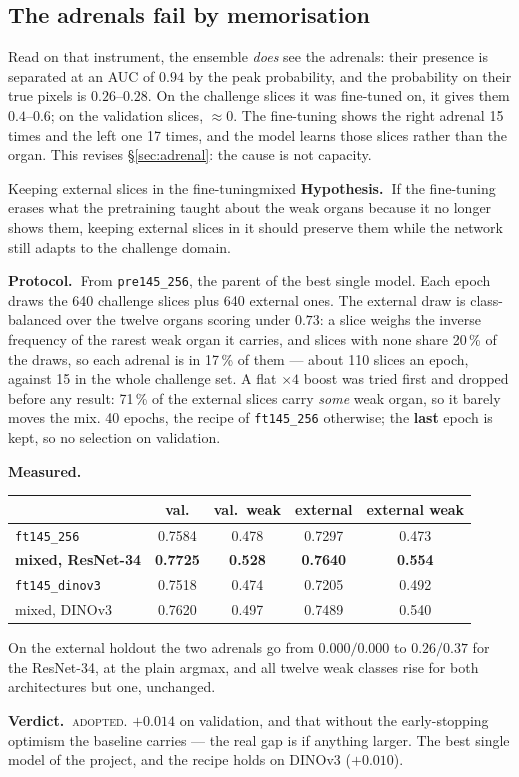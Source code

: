 \documentclass{article}
\newcommand{\hyp}{\textbf{Hypothesis.\ }}
\newcommand{\proto}{\textbf{Protocol.\ }}
\newcommand{\meas}{\textbf{Measured.\ }}
\newcommand{\verd}{\textbf{Verdict.\ }}
\newcommand{\adopted}{\textcolor{mygreen}{\textsc{adopted}}}
\begin{document}
\subsection{The adrenals fail by memorisation}

Read on that instrument, the ensemble \emph{does} see the adrenals: their
presence is separated at an AUC of $0.94$ by the peak probability, and the
probability on their true pixels is $0.26$--$0.28$. On the challenge slices it
was fine-tuned on, it gives them $0.4$--$0.6$; on the validation slices,
$\approx 0$. The fine-tuning shows the right adrenal 15 times and the left one
17 times, and the model learns those slices rather than the organ. This revises
\S\ref{sec:adrenal}: the cause is not capacity.

\begin{expwin}{Keeping external slices in the fine-tuning}{mixed}
\hyp If the fine-tuning erases what the pretraining taught about the weak organs
because it no longer shows them, keeping external slices in it should preserve
them while the network still adapts to the challenge domain.

\proto From \texttt{pre145\_256}, the parent of the best single model. Each
epoch draws the 640 challenge slices plus 640 external ones. The external draw is
class-balanced over the twelve organs scoring under $0.73$: a slice weighs the
inverse frequency of the rarest weak organ it carries, and slices with none share
20\,\% of the draws, so each adrenal is in 17\,\% of them --- about 110 slices an
epoch, against 15 in the whole challenge set. A flat $\times4$ boost was tried
first and dropped before any result: 71\,\% of the external slices carry
\emph{some} weak organ, so it barely moves the mix. 40 epochs, the recipe of
\texttt{ft145\_256} otherwise; the \textbf{last} epoch is kept, so no selection
on validation.

\meas
\begin{center}
\begin{tabular}{lcccc}
\hline
 & \textbf{val.} & \textbf{val.\ weak} & \textbf{external} & \textbf{external weak} \\
\hline
\texttt{ft145\_256} & 0.7584 & 0.478 & 0.7297 & 0.473 \\
\textbf{mixed, ResNet-34} & \textbf{0.7725} & \textbf{0.528} & \textbf{0.7640} & \textbf{0.554} \\
\hline
\texttt{ft145\_dinov3} & 0.7518 & 0.474 & 0.7205 & 0.492 \\
mixed, DINOv3 & 0.7620 & 0.497 & 0.7489 & 0.540 \\
\hline
\end{tabular}
\end{center}
On the external holdout the two adrenals go from $0.000/0.000$ to $0.26/0.37$
for the ResNet-34, at the plain argmax, and all twelve weak classes rise for both
architectures but one, unchanged.

\verd \adopted. $+0.014$ on validation, and that without the early-stopping
optimism the baseline carries --- the real gap is if anything larger. The best
single model of the project, and the recipe holds on DINOv3 ($+0.010$).
\end{expwin}
\end{document}
